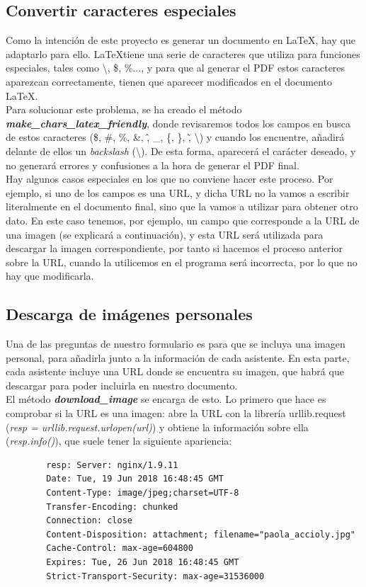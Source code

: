 \documentclass[a4paper, 12pt]{book}
\begin{document}
\subsection{Convertir caracteres especiales}
\label{subsec:especialCars}
Como la intención de este proyecto es generar un documento en \LaTeX, hay que adaptarlo para ello. \LaTeX tiene una serie de caracteres que utiliza para funciones especiales, tales como \textbackslash, \$, \%..., y para que al generar el PDF estos caracteres aparezcan correctamente, tienen que aparecer modificados en el documento \LaTeX.\\

Para solucionar este problema, se ha creado el método \textbf{\textit{make\_chars\_latex\_friendly}}, donde revisaremos todos los campos en busca de estos caracteres (\$, \#, \%, \&, \^, \_, \{, \}, \~ , \textbackslash) y cuando los encuentre, añadirá delante de ellos un \textit{backslash} (\textbackslash). De esta forma, aparecerá el carácter deseado, y no generará errores y confusiones a la hora de generar el PDF final.\\

Hay algunos casos especiales en los que no conviene hacer este proceso. Por ejemplo, si uno de los campos es una URL, y dicha URL no la vamos a escribir literalmente en el documento final, sino que la vamos a utilizar para obtener otro dato. En este caso tenemos, por ejemplo, un campo que corresponde a la URL de una imagen (se explicará a continuación), y esta URL será utilizada para descargar la imagen correspondiente, por tanto si hacemos el proceso anterior sobre la URL, cuando la utilicemos en el programa será incorrecta, por lo que no hay que modificarla.


\subsection{Descarga de imágenes personales}
\label{subsec:imagenes}
Una de las preguntas de nuestro formulario es para que se incluya una imagen personal, para añadirla junto a la información de cada asistente. En esta parte, cada asistente incluye una URL donde se encuentra su imagen, que habrá que descargar para poder incluirla en nuestro documento.\\

El método \textbf{\textit{download\_image}} se encarga de esto. Lo primero que hace es comprobar si la URL es una imagen: abre la URL con la librería urllib.request (\textit{resp = urllib.request.urlopen(url)}) y obtiene la información sobre ella (\textit{resp.info()}), que suele tener la siguiente apariencia:
\begin{verbatim}
        resp: Server: nginx/1.9.11
        Date: Tue, 19 Jun 2018 16:48:45 GMT
        Content-Type: image/jpeg;charset=UTF-8
        Transfer-Encoding: chunked
        Connection: close
        Content-Disposition: attachment; filename="paola_accioly.jpg"
        Cache-Control: max-age=604800
        Expires: Tue, 26 Jun 2018 16:48:45 GMT
        Strict-Transport-Security: max-age=31536000
\end{verbatim}
\end{document}
